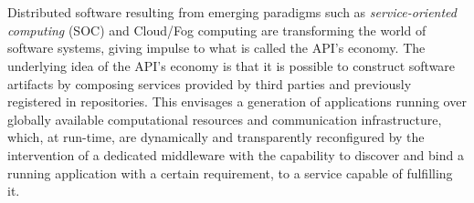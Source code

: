 \chapter*{\runtitle}

Distributed software resulting from emerging paradigms such as \emph{service-oriented computing} (SOC) and Cloud/Fog computing are transforming the world of software systems, giving impulse to what is called the API's economy. The underlying idea of the API's economy is that it is possible to construct software artifacts by composing services provided by third parties and previously registered in repositories. This envisages a generation of applications running over globally available computational resources and communication infrastructure, which, at run-time, are dynamically and transparently reconfigured by the intervention of a dedicated middleware with the capability to discover and bind a running application with a certain requirement, to a service capable of fulfilling it.

